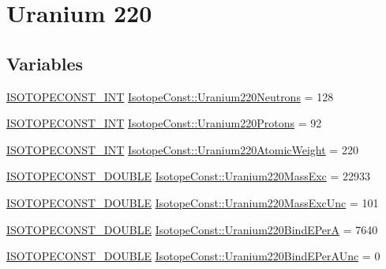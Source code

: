 \hypertarget{group___isotope_const-_uranium-_u220}{}\section{Uranium 220}
\label{group___isotope_const-_uranium-_u220}
\subsection*{Variables}
\begin{DoxyCompactItemize}
\item 
\mbox{\hyperlink{group___isotope_const-_macros_ga5f18360b3e99483a35c32d789e62621c}{I\+S\+O\+T\+O\+P\+E\+C\+O\+N\+S\+T\+\_\+\+I\+NT}} \mbox{\hyperlink{group___isotope_const-_uranium-_u220_ga810fb93d188c9867efd234e0d4fab607}{Isotope\+Const\+::\+Uranium220\+Neutrons}} = 128
\item 
\mbox{\hyperlink{group___isotope_const-_macros_ga5f18360b3e99483a35c32d789e62621c}{I\+S\+O\+T\+O\+P\+E\+C\+O\+N\+S\+T\+\_\+\+I\+NT}} \mbox{\hyperlink{group___isotope_const-_uranium-_u220_ga42d6b021c6c02d1dfede03c27237c342}{Isotope\+Const\+::\+Uranium220\+Protons}} = 92
\item 
\mbox{\hyperlink{group___isotope_const-_macros_ga5f18360b3e99483a35c32d789e62621c}{I\+S\+O\+T\+O\+P\+E\+C\+O\+N\+S\+T\+\_\+\+I\+NT}} \mbox{\hyperlink{group___isotope_const-_uranium-_u220_ga0593b453caf49757e37ffc108b9ffe56}{Isotope\+Const\+::\+Uranium220\+Atomic\+Weight}} = 220
\item 
\mbox{\hyperlink{group___isotope_const-_macros_ga8f45a7272ce02c0b4c65c44636ed719a}{I\+S\+O\+T\+O\+P\+E\+C\+O\+N\+S\+T\+\_\+\+D\+O\+U\+B\+LE}} \mbox{\hyperlink{group___isotope_const-_uranium-_u220_gac8e136c0a32df3f03e0dae7af4fc93b7}{Isotope\+Const\+::\+Uranium220\+Mass\+Exc}} = 22933
\item 
\mbox{\hyperlink{group___isotope_const-_macros_ga8f45a7272ce02c0b4c65c44636ed719a}{I\+S\+O\+T\+O\+P\+E\+C\+O\+N\+S\+T\+\_\+\+D\+O\+U\+B\+LE}} \mbox{\hyperlink{group___isotope_const-_uranium-_u220_ga565ea78756853156d2dcac600a9d2e35}{Isotope\+Const\+::\+Uranium220\+Mass\+Exc\+Unc}} = 101
\item 
\mbox{\hyperlink{group___isotope_const-_macros_ga8f45a7272ce02c0b4c65c44636ed719a}{I\+S\+O\+T\+O\+P\+E\+C\+O\+N\+S\+T\+\_\+\+D\+O\+U\+B\+LE}} \mbox{\hyperlink{group___isotope_const-_uranium-_u220_gaf9889480a95b16de41e602a4ace70f17}{Isotope\+Const\+::\+Uranium220\+Bind\+E\+PerA}} = 7640
\item 
\mbox{\hyperlink{group___isotope_const-_macros_ga8f45a7272ce02c0b4c65c44636ed719a}{I\+S\+O\+T\+O\+P\+E\+C\+O\+N\+S\+T\+\_\+\+D\+O\+U\+B\+LE}} \mbox{\hyperlink{group___isotope_const-_uranium-_u220_gae0924814690d7c29f607e8dcde5e4a92}{Isotope\+Const\+::\+Uranium220\+Bind\+E\+Per\+A\+Unc}} = 0

\end{DoxyCompactItemize}
